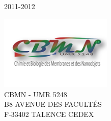 \begin{titlepage}
\begin{center}
\vfill

\begin{center}
2011-2012
\end{center}
\includegraphics[width=0.4\textwidth]{./banniere_cbmn.png}\\[1cm]    
CBMN - UMR 5248 \\
B8 AVENUE DES FACULTÉS \\
F-33402 TALENCE CEDEX \\


\end{center}

\end{titlepage}
%